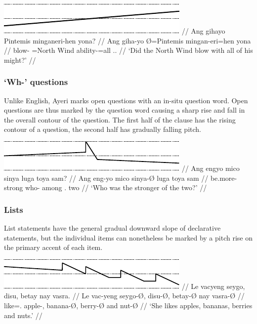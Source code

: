 \ex[belowexskip=0em]\begingl
	\glpreamble \raisebox{-1.5em}
		{\includegraphics{images/contours-ynquestion.pdf}} //
	\gla Ang gihayo Pintemis minganeri-hen yona? //
	\glb Ang giha-yo Ø=Pintemis mingan-eri=hen yona //
	\glc \AgtT{} blow-\TsgN{} \Top{}={North Wind} ability-\Ins{}=all
		\TsgN{}.\Gen{}. //
	\glft `Did the North Wind blow with all of his might?' //
\endgl\xe

\subsubsection{`Wh-' questions}

Unlike English, Ayeri marks open questions with an in-situ question word.
Open questions are thus marked by the question word causing a sharp rise and 
fall in the overall contour of the question. The first half of the clause has 
the rising contour of a question, the second half has gradually falling pitch.

\ex[belowexskip=0em]\begingl
	\glpreamble \raisebox{-1.5em}
		{\includegraphics{images/contours-whquestion.pdf}} //
	\gla Ang engyo mico sinya luga toya sam? //
	\glb Ang eng-yo mico sinya-Ø luga toya sam //
	\glc \AgtT{} be.more-\TsgN{} strong who-\Top{} among \TplN{}.\Loc{}
		two //
	\glft `Who was the stronger of the two?' //
\endgl\xe

\subsubsection{Lists}

List statements have the general gradual downward slope of 
declarative statements, but the individual items can nonetheless be marked by a 
pitch rise on the primary accent of each item.

\ex[belowexskip=0em]\begingl
	\glpreamble \raisebox{-1.5em}
		{\includegraphics{images/contours-list.pdf}} //
	\gla Le vacyeng seygo, disu, betay nay vasra. //
	\glb Le vac-yeng seygo-Ø, disu-Ø, betay-Ø nay vasra-Ø //
	\glc \PatTI{} like=\TsgF{}.\Aarg{} apple-\Top{}, banana-Ø, berry-Ø and
		nut-Ø //
	\glft `She likes apples, bananas, berries and nuts.' //
\endgl\xe

